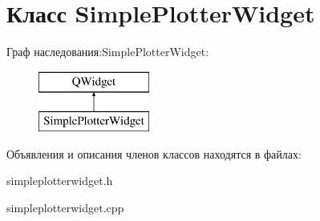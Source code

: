 \hypertarget{class_simple_plotter_widget}{}\section{Класс Simple\+Plotter\+Widget}
\label{class_simple_plotter_widget}
Граф наследования\+:Simple\+Plotter\+Widget\+:\begin{figure}[H]
\begin{center}
\leavevmode
\includegraphics[height=2.000000cm]{class_simple_plotter_widget}
\end{center}
\end{figure}


Объявления и описания членов классов находятся в файлах\+:\begin{DoxyCompactItemize}
\item 
simpleplotterwidget.\+h\item 
simpleplotterwidget.\+cpp\end{DoxyCompactItemize}
